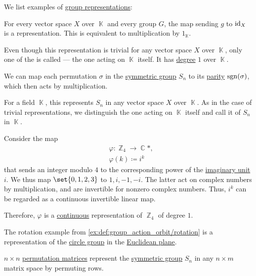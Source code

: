 \begin{example}\label{ex:def:group_representation}
  We list examples of \hyperref[def:group_representation]{group representations}:
  \begin{thmenum}
     For every vector space \( X \) over \( \BbbK \) and every group \( G \), the map sending \( g \) to \( \operatorname{id}_X \) is a representation. This is equivalent to multiplication by \( 1_\BbbK \).

    Even though this representation is trivial for any vector space \( X \) over \( \BbbK \), only one of the is called   --- the one acting on \( \BbbK \) itself. It has \hyperref[def:group_representation_degree]{degree} \( 1 \) over \( \BbbK \).

     We can map each permutation \( \sigma \) in the \hyperref[def:symmetric_group]{symmetric group} \( S_n \) to its \hyperref[def:permutation_parity]{parity} \( \operatorname{sgn}(\sigma) \), which then acts by multiplication.

    For a field \( \BbbK \), this represents \( S_n \) in any vector space \( X \) over \( \BbbK \). As in the case of trivial representations, we distinguish the one acting on \( \BbbK \) itself and call it   of \( S_n \) in \( \BbbK \).

     Consider the map
    \begin{equation*}
      \begin{aligned}
        &\varphi: \BbbZ_4 \to \BbbC*, \\
        &\varphi(k) \coloneqq i^k
      \end{aligned}
    \end{equation*}
    that sends an integer modulo \( 4 \) to the corresponding power of the \hyperref[def:complex_numbers]{imaginary unit} \( i \). We thus map \( \set{ 0, 1, 2, 3 } \) to \( 1, i, -1, -i \). The latter act on complex numbers by multiplication, and are invertible for nonzero complex numbers. Thus, \( i^k \) can be regarded as a continuous invertible linear map.

    Therefore, \( \varphi \) is a \hyperref[def:continuous_group_representation]{continuous} representation of \( \BbbZ_4 \) of degree \( 1 \).

     The rotation example from \cref{ex:def:group_action_orbit/rotation} is a representation of the \hyperref[def:circle_group]{circle group} in the \hyperref[def:euclidean_plane]{Euclidean plane}.

     \( n \times n \) \hyperref[def:elementary_matrix/permutation]{permutation matrices} represent the \hyperref[def:symmetric_group]{symmetric group} \( S_n \) in any \( n \times m \) matrix space by permuting rows.
  \end{thmenum}
\end{example}

